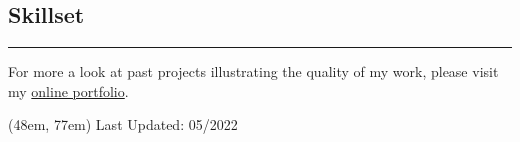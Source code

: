 \documentclass[20pt]{article}
\begin{document}
\begin{textblock*}{45em}
        {\section*{\fontsize{15}{15}\selectfont Skillset}}

        \newcommand\skillone[1]{{\noindent \fontsize{14}{14}\selectfont\textbf{#1}}{\hfill\fontsize{13}{13}\selectfont 1/5 \color{swingy_pink}[\color{mint}$\,\blacksquare\,\square\,\square\,\square\,\square$ \color{swingy_pink}]}\newline}
        \newcommand\skilltwo[1]{{\noindent \fontsize{14}{14}\selectfont\textbf{#1}}{\hfill\fontsize{13}{13}\selectfont 2/5 \color{swingy_pink}[\color{mint}$\,\blacksquare\,\blacksquare\,\square\,\square\,\square$ \color{swingy_pink}]}\newline}
        \newcommand\skillthree[1]{{\noindent \fontsize{14}{14}\selectfont\textbf{#1}}{\hfill\fontsize{13}{13}\selectfont 3/5 \color{swingy_pink}[\color{mint}$\,\blacksquare\,\blacksquare\,\blacksquare\,\square\,\square$ \color{swingy_pink}]}\newline}
        \newcommand\skillfour[1]{{\noindent \fontsize{14}{14}\selectfont\textbf{#1}}{\hfill\fontsize{13}{13}\selectfont 4/5 \color{swingy_pink}[\color{mint}$\,\blacksquare\,\blacksquare\,\blacksquare\,\blacksquare\,\square$ \color{swingy_pink}]}\newline}
        \newcommand\skillfive[1]{{\noindent \fontsize{14}{14}\selectfont\textbf{#1}}{\hfill\fontsize{13}{13}\selectfont 5/5 \color{swingy_pink}[\color{mint}$\,\blacksquare\,\blacksquare\,\blacksquare\,\blacksquare\,\blacksquare$ \color{swingy_pink}]}\newline}



        \vspace{1.5em}
        {\color{swingy_pink}\rule{\linewidth}{1.5pt}}
        For more a look at past projects illustrating the quality of my work, please
        visit my \href{https://clemens-cords.com/portfolio}{online portfolio}.
    \end{textblock*}

    \begin{textblock*}{\textwidth}(48em, 77em)
        \fontsize{10}{10}\selectfont \color{gray} Last Updated: 05/2022
    \end{textblock*}
\end{document}
